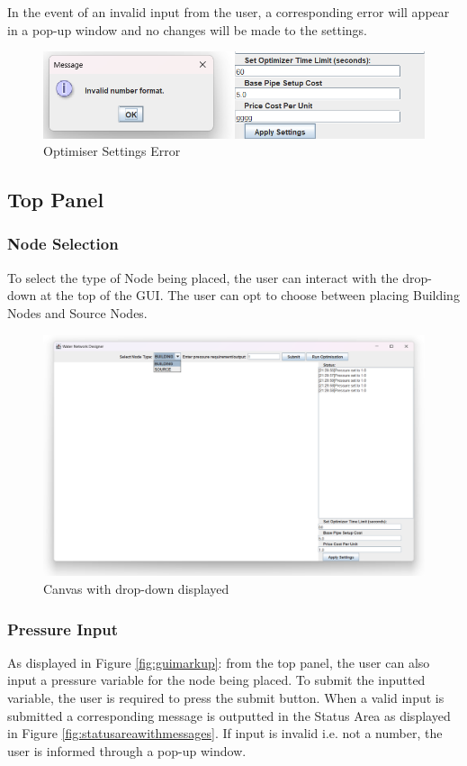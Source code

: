 In the event of an invalid input from the user, a corresponding error will appear in a pop-up window and no changes will be made to the settings.
\begin{figure}[H]
    \centering
    \includegraphics[width=0.6\linewidth]{optimisersettingserror.png}
    \caption{Optimiser Settings Error}
    \label{fig:optimisersettingserror}
\end{figure}

\subsection{Top Panel}
\subsubsection{Node Selection}
To select the type of Node being placed, the user can interact with the drop-down at the top of the GUI. The user can opt to choose between placing Building Nodes and Source Nodes.

\begin{figure}[H]
    \centering
    \includegraphics[width=0.8\linewidth]{canvaswithdropdown.png}
    \caption{Canvas with drop-down displayed}
    \label{fig:canvaswithdropdown}
\end{figure}

\subsubsection{Pressure Input}
As displayed in Figure \ref{fig:guimarkup}: from the top panel, the user can also input a pressure variable for the node being placed. To submit the inputted variable, the user is required to press the submit button. When a valid input is submitted a corresponding message is outputted in the Status Area as displayed in Figure \ref{fig:statusareawithmessages}. If input is invalid i.e. not a number, the user is informed through a pop-up window.

